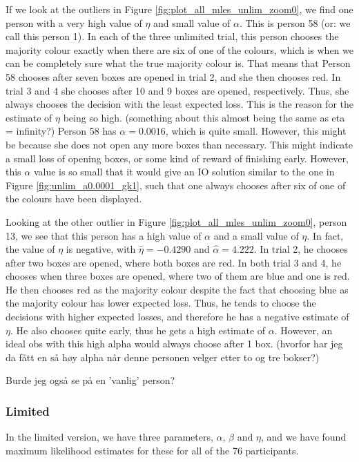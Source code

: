  
If we look at the outliers in Figure \ref{fig:plot_all_mles_unlim_zoom0}, we find one person with a very high value of $\eta$ and small value of $\alpha$. This is person 58 (or: we call this person 1). In each of the three unlimited trial, this person chooses the majority colour exactly when there are six of one of the colours, which is when we can be completely sure what the true majority colour is. That means that Person 58 chooses after seven boxes are opened in trial 2, and she then chooses red. In trial 3 and 4 she chooses after 10 and 9 boxes are opened, respectively. Thus, she always chooses the decision with the least expected loss. This is the reason for the estimate of $\eta$ being so high. (something about this almost being the same as eta = infinity?) Person 58 has $\alpha=0.0016$, which is quite small. However, this might be because she does not open any more boxes than necessary. This might indicate a small loss of opening boxes, or some kind of reward of finishing early. However, this $\alpha$ value is so small that it would give an IO solution similar to the one in Figure \ref{fig:unlim_a0.0001_gk1}, such that one always chooses after six of one of the colours have been displayed. 

Looking at the other outlier in Figure \ref{fig:plot_all_mles_unlim_zoom0}, person 13, we see that this person has a high value of $\alpha$ and a small value of $\eta$. In fact, the value of $\eta$ is negative,  with $\hat{\eta}=-0.4290$ and $\hat{\alpha}=4.222$. In trial 2, he chooses after two boxes are opened, where both boxes are red. In both trial 3 and 4, he chooses when three boxes are opened, where two of them are blue and one is red. He then chooses red as the majority colour despite the fact that choosing blue as the majority colour has lower expected loss. Thus, he tends to choose the decisions with higher expected losses, and therefore he has a negative estimate of $\eta$. He also chooses quite early, thus he gets a high estimate of $\alpha$. However, an ideal obs with this high alpha would always choose after 1 box. (hvorfor har jeg da fått en så høy alpha når denne personen velger etter to og tre bokser?)


Burde jeg også se på en 'vanlig' person?



\subsubsection{Limited}
In the limited version, we have three parameters, $\alpha$, $\beta$ and $\eta$, and we have found maximum likelihood estimates for these for all of the 76 participants. 


